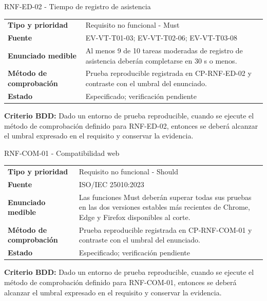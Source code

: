 \begin{reqbox}[colframe=Teal]{RNF-ED-02 - Tiempo de registro de asistencia}
\begin{tabularx}{\textwidth}{>{\bfseries}p{3.2cm}Y}
Tipo y prioridad & Requisito no funcional - Must \\
Fuente & EV-VT-T01-03; EV-VT-T02-06; EV-VT-T03-08 \\
Enunciado medible & Al menos 9 de 10 tareas moderadas de registro de asistencia deberán completarse en 30 s o menos. \\
Método de comprobación & Prueba reproducible registrada en CP-RNF-ED-02 y contraste con el umbral del enunciado. \\
Estado & Especificado; verificación pendiente \\
\end{tabularx}
\textbf{Criterio BDD:} Dado un entorno de prueba reproducible, cuando se ejecute el método de comprobación definido para RNF-ED-02, entonces se deberá alcanzar el umbral expresado en el requisito y conservar la evidencia.
\end{reqbox}


\begin{reqbox}[colframe=Teal]{RNF-COM-01 - Compatibilidad web}
\begin{tabularx}{\textwidth}{>{\bfseries}p{3.2cm}Y}
Tipo y prioridad & Requisito no funcional - Should \\
Fuente & ISO/IEC 25010:2023 \\
Enunciado medible & Las funciones Must deberán superar todas sus pruebas en las dos versiones estables más recientes de Chrome, Edge y Firefox disponibles al corte. \\
Método de comprobación & Prueba reproducible registrada en CP-RNF-COM-01 y contraste con el umbral del enunciado. \\
Estado & Especificado; verificación pendiente \\
\end{tabularx}
\textbf{Criterio BDD:} Dado un entorno de prueba reproducible, cuando se ejecute el método de comprobación definido para RNF-COM-01, entonces se deberá alcanzar el umbral expresado en el requisito y conservar la evidencia.
\end{reqbox}


